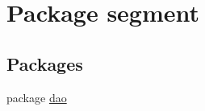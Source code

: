 \hypertarget{namespacesegment}{}\section{Package segment}
\label{namespacesegment}
\subsection*{Packages}
\begin{DoxyCompactItemize}
\item 
package \mbox{\hyperlink{namespacesegment_1_1dao}{dao}}
\end{DoxyCompactItemize}
